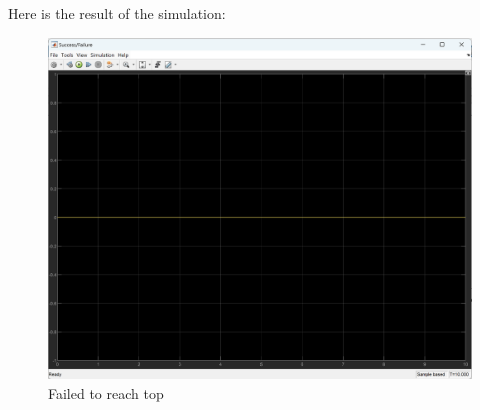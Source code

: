 \documentclass{article}
\begin{document}
    Here is the result of the simulation:
    \begin{figure}[H]
        \centering
        \includegraphics[width=0.8\linewidth]{failuer_1.png}
        \caption{Failed to reach top}
        \label{fig:enter-label}
    \end{figure}
\end{document}
